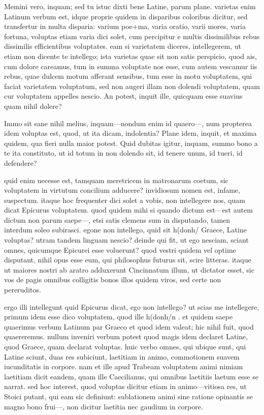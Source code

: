  Memini vero, inquam; sed tu istuc dixti bene Latine, parum plane. varietas enim Latinum verbum est, idque proprie quidem in disparibus coloribus dicitur, sed transfertur in multa disparia: varium poe+ma, varia oratio, varii mores, varia fortuna, voluptas etiam varia dici solet, cum percipitur e multis dissimilibus rebus dissimilis efficientibus voluptates. eam si varietatem diceres, intellegerem, ut etiam non dicente te intellego; ista varietas quae sit non satis perspicio, quod ais, cum dolore careamus, tum in summa voluptate nos esse, cum autem vescamur iis rebus, quae dulcem motum afferant sensibus, tum esse in motu voluptatem, qui faciat varietatem voluptatum, sed non augeri illam non dolendi voluptatem, quam cur voluptatem appelles nescio. An potest, inquit ille, quicquam esse suavius quam nihil dolere?

 Immo sit sane nihil melius, inquam—nondum enim id quaero—, num propterea idem voluptas est, quod, ut ita dicam, indolentia? Plane idem, inquit, et maxima quidem, qua fieri nulla maior potest. Quid dubitas igitur, inquam, summo bono a te ita constituto, ut id totum in non dolendo sit, id tenere unum, id tueri, id defendere?

 quid enim necesse est, tamquam meretricem in matronarum coetum, sic voluptatem in virtutum concilium adducere? invidiosum nomen est, infame, suspectum. itaque hoc frequenter dici solet a vobis, non intellegere nos, quam dicat Epicurus voluptatem. quod quidem mihi si quando dictum est—est autem dictum non parum saepe—, etsi satis clemens sum in disputando, tamen interdum soleo subirasci. egone non intellego, quid sit h(donh/ Graece, Latine voluptas? utram tandem linguam nescio? deinde qui fit, ut ego nesciam, sciant omnes, quicumque Epicurei esse voluerunt? quod vestri quidem vel optime disputant, nihil opus esse eum, qui philosophus futurus sit, scire litteras. itaque ut maiores nostri ab aratro adduxerunt Cincinnatum illum, ut dictator esset, sic vos de pagis omnibus colligitis bonos illos quidem viros, sed certe non pereruditos.

 ergo illi intellegunt quid Epicurus dicat, ego non intellego? ut scias me intellegere, primum idem esse dico voluptatem, quod ille h(donh/n . et quidem saepe quaerimus verbum Latinum par Graeco et quod idem valeat; hic nihil fuit, quod quaereremus. nullum inveniri verbum potest quod magis idem declaret Latine, quod Graece, quam declarat voluptas. huic verbo omnes, qui ubique sunt, qui Latine sciunt, duas res subiciunt, laetitiam in animo, commotionem suavem iucunditatis in corpore. nam et ille apud Trabeam voluptatem animi nimiam laetitiam dicit eandem, quam ille Caecilianus, qui omnibus laetitiis laetum esse se narrat. sed hoc interest, quod voluptas dicitur etiam in animo—vitiosa res, ut Stoici putant, qui eam sic definiunt: sublationem animi sine ratione opinantis se magno bono frui—, non dicitur laetitia nec gaudium in corpore.

